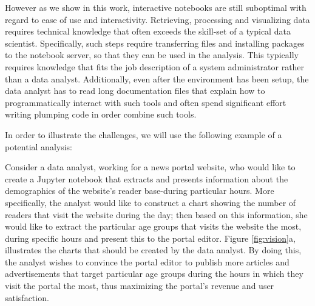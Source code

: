 However as we show in this work, interactive notebooks are still suboptimal with regard to ease of use and interactivity. Retrieving, processing and visualizing data requires technical knowledge that often exceeds the skill-set of a typical data scientist. Specifically, such steps require transferring files and installing packages to the notebook server, so that they can be used in the analysis. This typically requires knowledge that fits the job description of a system administrator rather than a data analyst. Additionally, even after the environment has been setup, the data analyst has to read long documentation files that explain how to programmatically interact with such tools and often spend significant effort writing plumping code in order combine such tools.


In order to illustrate the challenges, we will use the following example of a potential analysis:

\begin{example}
Consider a data analyst, working for a news portal website, who would like to create a Jupyter notebook that extracts and presents information about the demographics of the website's reader base-during particular hours. More specifically, the analyst would like to construct a chart showing the number of readers that visit the website during the day; then based on this information, she would like to extract the particular age groups that visits the website the most, during specific hours and present this to the portal editor. Figure \ref{fig:vision}a, illustrates the charts that should be created by the data analyst. By doing this, the analyst wishes to convince the portal editor to publish more articles and advertisements that target particular age groups during the hours in which they visit the portal the most, thus maximizing the portal's revenue and user satisfaction.
\end{example}


